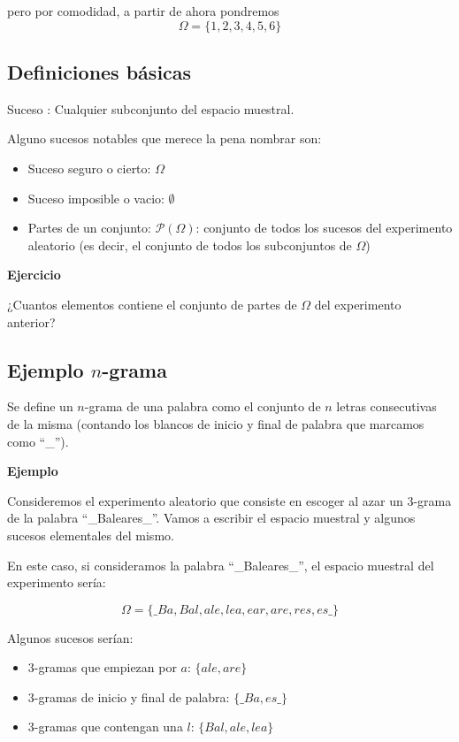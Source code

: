 \documentclass[]{book}
\providecommand{\tightlist}{%
  \setlength{\itemsep}{0pt}\setlength{\parskip}{0pt}}
\begin{document}
pero por comodidad, a partir de ahora pondremos
\[\Omega = \{1,2,3,4,5,6\}\]

\hypertarget{definiciones-buxe1sicas-1}{%
\subsection{Definiciones básicas}\label{definiciones-buxe1sicas-1}}

 Suceso : Cualquier subconjunto del espacio muestral.

Alguno sucesos notables que merece la pena nombrar son:

\begin{itemize}
\tightlist
\item
  Suceso seguro o cierto: \(\Omega\)
\item
  Suceso imposible o vacio: \(\emptyset\)
\item
  Partes de un conjunto: \(\mathcal{P}(\Omega)\): conjunto de todos los sucesos del experimento aleatorio (es decir, el conjunto de todos los subconjuntos de \(\Omega\))
\end{itemize}

\textbf{Ejercicio}

¿Cuantos elementos contiene el conjunto de partes de \(\Omega\) del experimento anterior?

\hypertarget{ejemplo-n-grama}{%
\subsection{\texorpdfstring{Ejemplo \(n\)-grama}{Ejemplo n-grama}}\label{ejemplo-n-grama}}

Se define un \(n\)-grama de una palabra como el conjunto de \(n\) letras consecutivas de la misma (contando los blancos de inicio y final de palabra que marcamos como ``\_'').

\textbf{Ejemplo}

Consideremos el experimento aleatorio que consiste en escoger al azar un 3-grama de la palabra ``\_Baleares\_''. Vamos a escribir el espacio muestral y algunos sucesos elementales del mismo.

En este caso, si consideramos la palabra ``\_Baleares\_'', el espacio muestral del experimento sería:

\[\Omega=\{\_Ba, Bal, ale, lea, ear, are, res, es\_\}\]

Algunos sucesos serían:

\begin{itemize}
\tightlist
\item
  3-gramas que empiezan por \(a\): \(\{ale,are\}\)
\item
  3-gramas de inicio y final de palabra: \(\{\_Ba,es\_\}\)
\item
  3-gramas que contengan una \(l\): \(\{Bal,ale,lea\}\)
\end{itemize}
\end{document}
